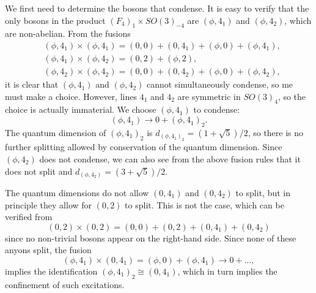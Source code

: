 \documentclass[11pt]{article}
\numberwithin{equation}{section}
\begin{document}
We first need to determine the bosons that condense. It is easy to verify that the only bosons in the product $(F_{4})_{1} \times SO(3)_{-4}$ are $(\phi,4_{1})$ and $(\phi,4_{2})$, which are non-abelian. From the fusions
\begin{align}
    &(\phi,4_{1}) \times (\phi,4_{1}) = (0,0) + (0,4_{1}) + (\phi,0) + (\phi,4_{1}), \\[0.3cm]
    &(\phi,4_{1}) \times (\phi,4_{2}) = (0,2) + (\phi,2), \\[0.3cm]
    &(\phi,4_{2}) \times (\phi,4_{2}) = (0,0) + (0,4_{2}) + (\phi,0) + (\phi,4_{2}),
\end{align}
it is clear that $(\phi,4_{1})$ and $(\phi,4_{2})$ cannot simultaneously condense, so me must make a choice. However, lines $4_{1}$ and $4_{2}$ are symmetric in $SO(3)_{4}$, so the choice is actually immaterial. We choose $(\phi,4_{1})$ to condense:
\begin{equation}
    (\phi,4_{1}) \longrightarrow 0 + (\phi,4_{1})_{2}.
\end{equation}
The quantum dimension of $(\phi,4_{1})_{2}$ is $d_{(\phi,4_{1})_{2}} = (1+\sqrt{5})/2$, so there is no further splitting allowed by conservation of the quantum dimension. Since $(\phi,4_{2})$ does not condense, we can also see from the above fusion rules that it does not split and $d_{(\phi,4_{2})} = (3 + \sqrt{5})/2$.

The quantum dimensions do not allow $(0,4_{1})$ and $(0,4_{2})$ to split, but in principle they allow for $(0,2)$ to split. This is not the case, which can be verified from
\begin{equation}
    (0,2) \times (0,2) = (0,0) + (0,2) + (0,4_{1}) + (0,4_{2})
\end{equation}
since no non-trivial bosons appear on the right-hand side. Since none of these anyons split, the fusion
\begin{equation}
    (\phi,4_{1}) \times (0,4_{1}) = (\phi, 0) + (\phi, 4_{1}) \longrightarrow 0 +\ldots,
\end{equation}
implies the identification $(\phi,4_{1})_{2} \cong (0,4_{1})$, which in turn implies the confinement of such excitations.
\end{document}
